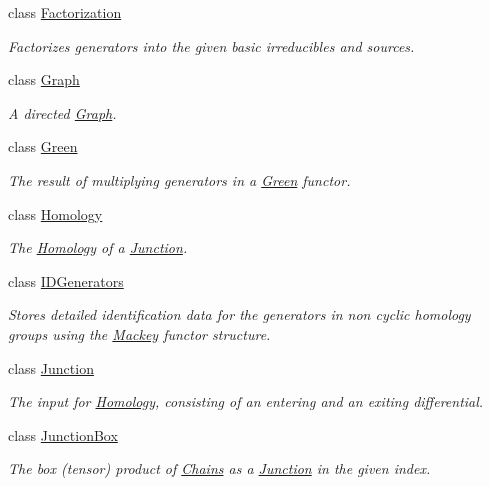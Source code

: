 \begin{DoxyCompactItemize}
class \hyperlink{classMackey_1_1Factorization}{Factorization}
\begin{DoxyCompactList}\small\item\em Factorizes generators into the given basic irreducibles and sources. \end{DoxyCompactList}\item 
class \hyperlink{classMackey_1_1Graph}{Graph}
\begin{DoxyCompactList}\small\item\em A directed \hyperlink{classMackey_1_1Graph}{Graph}. \end{DoxyCompactList}\item 
class \hyperlink{classMackey_1_1Green}{Green}
\begin{DoxyCompactList}\small\item\em The result of multiplying generators in a \hyperlink{classMackey_1_1Green}{Green} functor. \end{DoxyCompactList}\item 
class \hyperlink{classMackey_1_1Homology}{Homology}
\begin{DoxyCompactList}\small\item\em The \hyperlink{classMackey_1_1Homology}{Homology} of a \hyperlink{classMackey_1_1Junction}{Junction}. \end{DoxyCompactList}\item 
class \hyperlink{classMackey_1_1IDGenerators}{I\+D\+Generators}
\begin{DoxyCompactList}\small\item\em Stores detailed identification data for the generators in non cyclic homology groups using the \hyperlink{namespaceMackey}{Mackey} functor structure. \end{DoxyCompactList}\item 
class \hyperlink{classMackey_1_1Junction}{Junction}
\begin{DoxyCompactList}\small\item\em The input for \hyperlink{classMackey_1_1Homology}{Homology}, consisting of an entering and an exiting differential. \end{DoxyCompactList}\item 
class \hyperlink{classMackey_1_1JunctionBox}{Junction\+Box}
\begin{DoxyCompactList}\small\item\em The box (tensor) product of \hyperlink{classMackey_1_1Chains}{Chains} as a \hyperlink{classMackey_1_1Junction}{Junction} in the given index. \end{DoxyCompactList}\item 

\end{DoxyCompactItemize}
